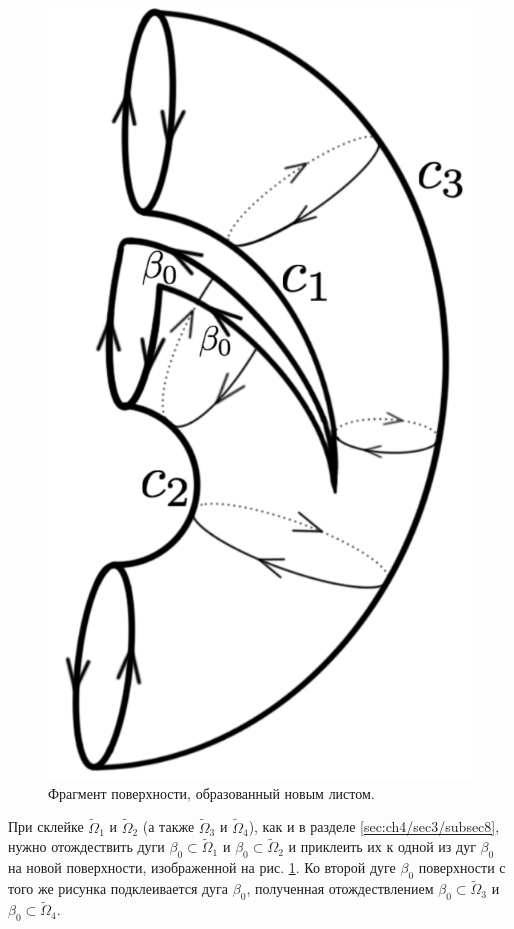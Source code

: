 \begin{figure}[!htb]
\endminipage\hfill
{}
\centering
\includegraphics[scale=0.11]{images/ch4/section3_circular/atoms/II/bifurcation/special_surface_1.pdf}
    \caption{Фрагмент поверхности, образованный новым листом.}
        \label{fig:pt10:_II_special_surface_1}
\endminipage\hfill
\end{figure}
 
 При склейке $\widetilde{\Omega}_1$ и $\widetilde{\Omega}_2$ (а также $\widetilde{\Omega}_3$ и $\widetilde{\Omega}_4$),  как и в разделе \ref{sec:ch4/sec3/subsec8}, нужно отождествить дуги $\beta_0 \subset \widetilde{\Omega}_1$  и $\beta_0 \subset \widetilde{\Omega}_2$ и приклеить их к одной из дуг $\beta_0$ на новой поверхности, изображенной на рис.  \ref{fig:pt10:_II_special_surface_1}.
Ко второй дуге $\beta_0$ поверхности с того же рисунка подклеивается дуга $\beta_0$, полученная отождествлением $\beta_0 \subset \widetilde{\Omega}_3$  и $\beta_0 \subset \widetilde{\Omega}_4$.

